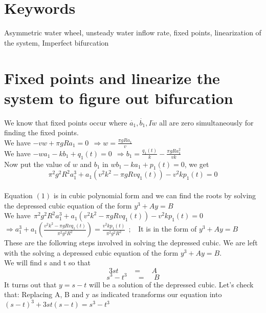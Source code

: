 \documentclass[12pt]{article}
\begin{document}
\section*{Keywords}
Asymmetric water wheel, unsteady water inflow rate, fixed points, linearization of the system, Imperfect bifurcation


\section*{Fixed points and linearize the system to figure out bifurcation }

We know that fixed points occur where $\dot{a_1},\dot{b_1},I\dot{w}$ all are zero simultaneously for finding the fixed points.\\
We have $-vw+ \pi gRa_1=0~~\Rightarrow w= \frac{\pi gRa_1}{v}$\\
We have $-wa_1-kb_1+q_1(t)=0~~\Rightarrow b_1=\frac{q_1(t)}{k}-\frac{\pi gRa_1^2}{vk}$\\
Now put the value of $ w$ and $b_1$ in $wb_1-ka_1+p_1(t)=0$, we get\\
\begin{equation}
\pi^2 g^2R^2a_1^3+a_1(v^2k^2-\pi gRvq_1(t))-v^2kp_1(t)=0
\end{equation}\\
Equation $(1)$ is in cubic polynomial form and we can find the roots by solving the depressed cubic equation of the form $y^3+Ay=B$\\
We have$ ~~\pi^2 g^2R^2a_1^3+a_1(v^2k^2-\pi gRvq_1(t))-v^2kp_1(t)=0
$\\
$ \Rightarrow a_1^3+a_1(\frac{v^2k^2-\pi gRvq_1(t)}{\pi^2 g^2R^2})=\frac{v^2kp_1(t)}{\pi^2 g^2R^2}~~;~~~~${It is in the form of $ y^3+Ay=B$}\\
These are the following steps involved in solving the depressed cubic. We are left with the solving a depressed cubic equation of the form $y^3+Ay=B$.\\
We will find s and t so that \\
\begin{equation}
3st~~~~~~~~~=~~~~~~A
\end{equation}
\begin{equation}
s^3-t^3~~~~~~=~~~~~B
\end{equation}
It turns out that $y=s-t$ will be a solution of the depressed cubic. Let's check that: Replacing A, B and y as indicated transforms our equation into\\
$ (s-t)^3+3st(s-t)=s^3-t^3$\\
\end{document}
